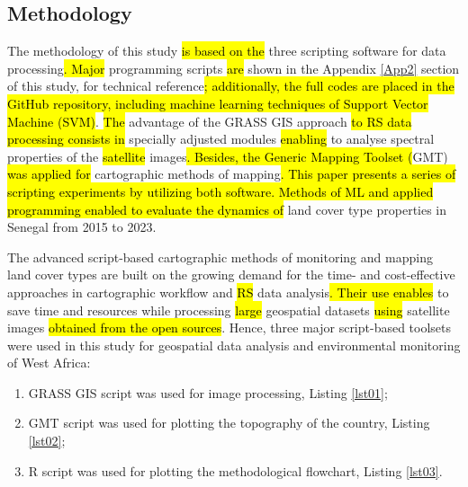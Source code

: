 \documentclass[earth,article,submit,pdftex,moreauthors]{Definitions/mdpi}
\begin{document}
\subsection{Methodology}

The methodology of this study \hl{is based on the} three scripting software for data processing\hl{. Major }programming scripts \hl{are} shown in the Appendix \ref{App2} section of this study, for technical reference\hl{; additionally, the full codes are placed in the GitHub repository, including machine learning techniques of Support Vector Machine (SVM)}. \hl{The} advantage of the GRASS GIS approach \hl{to RS data processing consists in} specially adjusted modules \hl{enabling }to analyse\hl{ }spectral properties of the \hl{satellite }images\hl{. Besides, the Generic Mapping Toolset (}GMT) \hl{was applied for }cartographic methods of mapping\hl{. This paper presents a series of scripting experiments by utilizing both software. Methods of ML and applied programming enabled to evaluate the dynamics of} land cover type properties in Senegal from 2015 to 2023. 

The advanced script-based cartographic methods of monitoring and mapping land cover types are built on the growing demand for the time- and cost-effective approaches in cartographic workflow and \hl{RS} data analysis\hl{. Their use enables} to save time and resources while processing \hl{large }geospatial datasets\hl{ using }satellite images \hl{obtained from the open sources}. Hence, three major script-based toolsets were used in this study for geospatial data analysis and environmental monitoring of West Africa:

 \begin{enumerate}
        \item GRASS GIS script was used for image processing, Listing \ref{lst01}; 
        \item GMT script was used for plotting the topography of the country, Listing \ref{lst02};  
        \item R script was used for plotting the methodological flowchart, Listing \ref{lst03}. 
  \end{enumerate}       
\end{document}
